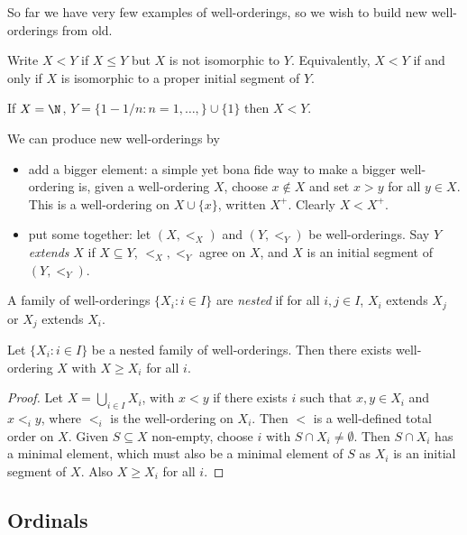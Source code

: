 \documentclass[a4paper]{article}
\begin{document}
So far we have very few examples of well-orderings, so we wish to build new well-orderings from old.

\begin{notation}
  Write \(X < Y\) if \(X \leq Y\) but \(X\) is not isomorphic to \(Y\). Equivalently, \(X < Y\) if and only if \(X\) is isomorphic to a proper initial segment of \(Y\).
\end{notation}

\begin{eg}
  If \(X = \N\), \(Y = \{1 - 1/n: n = 1, \dots, \} \cup \{1\}\) then \(X < Y\).
\end{eg}

We can produce new well-orderings by
\begin{itemize}
\item add a bigger element: a simple yet bona fide way to make a bigger well-ordering is, given a well-ordering \(X\), choose \(x \notin X\) and set \(x > y\) for all \(y \in X\). This is a well-ordering on \(X \cup \{x\}\), written \(X^+\). Clearly \(X < X^+\).
\item put some together: let \((X, <_X)\) and \((Y, <_Y)\) be well-orderings. Say \(Y\) \emph{extends} \(X\) if \(X \subseteq Y\), \(<_X, <_Y\) agree on \(X\), and \(X\) is an initial segment of \((Y, <_Y)\).
\end{itemize}

A family of well-orderings \(\{X_i: i \in I\}\) are \emph{nested} if for all \(i, j \in I\), \(X_i\) extends \(X_j\) or \(X_j\) extends \(X_i\).

\begin{proposition}
  \label{prop:nested well-orderings}
  Let \(\{X_i: i \in I\}\) be a nested family of well-orderings. Then there exists well-ordering \(X\) with \(X \geq X_i\) for all \(i\).
\end{proposition}

\begin{proof}
  Let \(X = \bigcup_{i \in I} X_i\), with \(x < y\) if there exists \(i\) such that \(x, y \in X_i\) and \(x <_i y\), where \(<_i\) is the well-ordering on \(X_i\). Then \(<\) is a well-defined total order on \(X\). Given \(S \subseteq X\) non-empty, choose \(i\) with \(S \cap X_i \neq \emptyset\). Then \(S \cap X_i\) has a minimal element, which must also be a minimal element of \(S\) as \(X_i\) is an initial segment of \(X\). Also \(X \geq X_i\) for all \(i\).
\end{proof}

\subsection{Ordinals}
\end{document}
